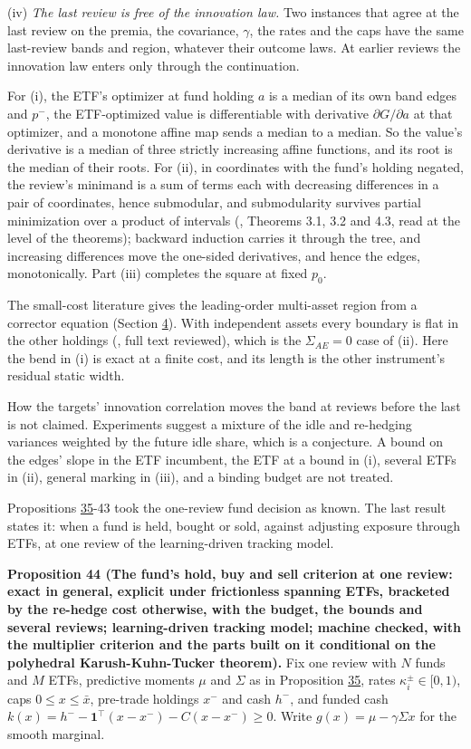\documentclass[11pt]{article}
\begin{document}
(iv) \emph{The last review is free of the innovation law.} Two instances that
agree at the last review on the premia, the covariance, \(\gamma\), the rates
and the caps have the same last-review bands and region, whatever
their outcome laws. At earlier reviews the innovation law enters only
through the continuation.

For (i), the ETF's optimizer at fund holding \(a\) is a median of its own
band edges and \(p^-\), the ETF-optimized value is differentiable with
derivative \(\partial G/\partial a\) at that optimizer, and a monotone affine map sends
a median to a median. So the value's derivative is a median of three
strictly increasing affine functions, and its root is the median of
their roots. For (ii), in coordinates with the fund's holding negated,
the review's minimand is a sum of terms each with decreasing
differences in a pair of coordinates, hence submodular, and
submodularity survives partial minimization over a product of
intervals (\cite{topkis1978minimizing}, Theorems 3.1, 3.2 and 4.3, read at
the level of the theorems); backward induction carries it through the
tree, and increasing differences move the one-sided derivatives, and
hence the edges, monotonically. Part (iii) completes the square at
fixed \(p_0\).

The small-cost literature gives the leading-order multi-asset region
from a corrector equation (Section \hyperref[sec:4]{4}). With independent assets every
boundary is flat in the other holdings (\cite{liu2013portfolio}, full text
reviewed), which is the \(\Sigma_{AE}=0\) case of (ii). Here the bend in (i) is exact
at a finite cost, and its length is the other instrument's residual
static width.

How the targets' innovation correlation moves the band at reviews
before the last is not claimed. Experiments suggest a mixture of the
idle and re-hedging variances weighted by the future idle share, which
is a conjecture. A bound on the edges' slope in the ETF incumbent, the
ETF at a bound in (i), several ETFs in (ii), general marking in (iii),
and a binding budget are not treated.

Propositions \hyperref[res:Proposition-35]{35}-43 took the one-review fund decision as known. The
last result states it: when a fund is held, bought or sold, against
adjusting exposure through ETFs, at one review of the learning-driven
tracking model.

\label{res:Proposition-44}
\textbf{Proposition 44 (The fund's hold, buy and sell criterion at one review: exact in general, explicit under frictionless spanning ETFs, bracketed by the re-hedge cost otherwise, with the budget, the bounds and several reviews; learning-driven tracking model; machine checked, with the multiplier criterion and the parts built on it conditional on the polyhedral Karush-Kuhn-Tucker theorem).}
Fix one review with \(N\) funds and \(M\) ETFs, predictive moments \(\mu\) and
\(\Sigma\) as in Proposition \hyperref[res:Proposition-35]{35}, rates \(\kappa^\pm_i\in[0,1)\), caps \(0\leq x\leq\bar x\),
pre-trade holdings \(x^-\) and cash \(h^-\), and funded cash
\(k(x)=h^--\mathbf1^\top(x-x^-)-C(x-x^-)\geq0\). Write \(g(x)=\mu-\gamma\Sigma x\) for the
smooth marginal.
\end{document}
